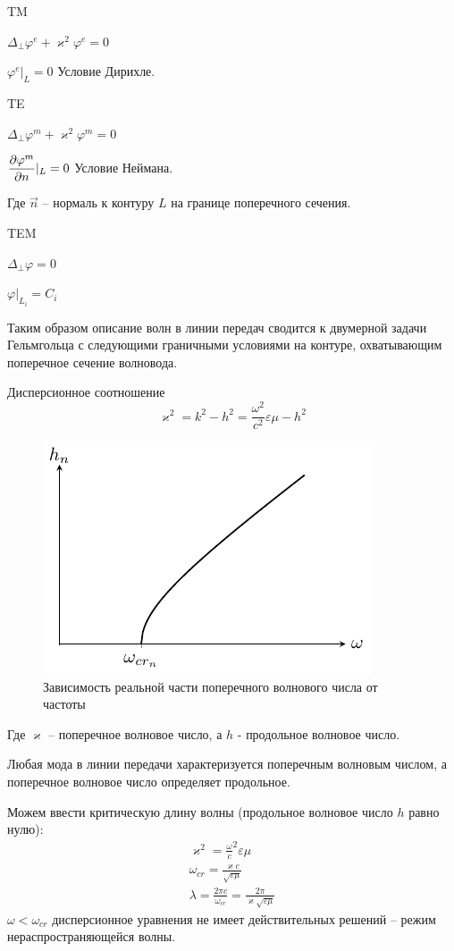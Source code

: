 \documentclass[a4paper,14pt]{extarticle}
\renewcommand{\phi}{\varphi}
\renewcommand{\epsilon}{\varepsilon}
\renewcommand{\kappa}{\varkappa}
\begin{document}
	TM
	
	$\Delta_\perp\phi^{e}+\kappa^2\phi^{e}=0$
	
	$\phi^e|_L = 0$
	Условие Дирихле.
	\vspace{20pt}
	
	TE
	
	$\Delta_\perp\phi^{m}+\kappa^2\phi^{m}=0$
	
	$\displaystyle \pdv{\phi^m}{n}|_L = 0$
	Условие Неймана.
	
	Где $\vec{n}$ -- нормаль к контуру $L$ на границе поперечного сечения.
	\vspace{20pt}
	
	TEM
	
	$\Delta_\perp\phi=0$
	
	$\phi|_{L_i} = C_i$
	
	Таким образом описание волн в линии передач сводится к двумерной задачи Гельмгольца с следующими граничными условиями на контуре, охватывающим поперечное сечение волновода.
	
	\newpage
	\hypertarget{num5}{}
	Дисперсионное соотношение 
	$$\kappa^2 = k^2 - h^2 = \frac{\omega^2}{c^2}\epsilon\mu - h^2$$
	\begin{figure}[h!]
		\centering
		\includegraphics[scale=1.6]{img/lect2_ris6}
		\caption{Зависимость реальной части поперечного волнового числа от частоты}
		\label{fig:wavegain:5}
	\end{figure}
	Где $\kappa$ -- поперечное волновое число, а $h$ - продольное волновое число. 
	
Любая мода в линии передачи характеризуется поперечным волновым числом, а поперечное волновое число определяет продольное.

Можем ввести критическую длину волны (продольное волновое число $h$ равно нулю):
\begin{gather*}
\kappa^2 = {\frac{\omega}{c}}^2 {\epsilon \mu}\\
\omega_{cr} = \frac{\kappa c}{\sqrt{\epsilon \mu}}\\
\lambda = \frac{2 \pi c}{\omega_{cr}} = \frac{2 \pi}{\kappa \sqrt{\epsilon \mu}}
\end{gather*}
$\omega < \omega_{cr}$ дисперсионное уравнения не имеет действительных решений -- режим нераспространяющейся волны. 
\end{document}
